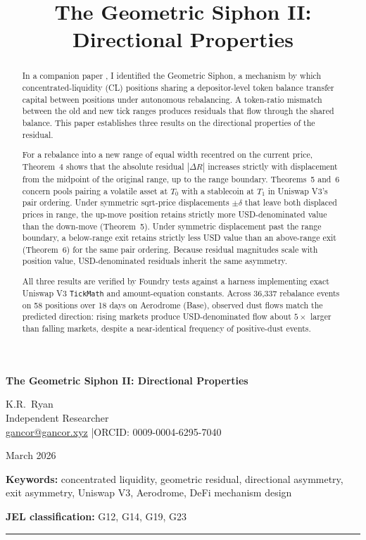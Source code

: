 \documentclass[11pt,a4paper]{article}
\title{The Geometric Siphon II: Directional Properties}
\theoremstyle{definition}
\begin{document}
\thispagestyle{plain}

\begin{center}
{\LARGE\bfseries The Geometric Siphon II: Directional Properties}

\vspace{12pt}
{\large K.R.\ Ryan}\\[4pt]
{\small Independent Researcher}\\[2pt]
{\small \href{mailto:gancor@gancor.xyz}{gancor@gancor.xyz} \quad|\quad ORCID: 0009-0004-6295-7040}

\vspace{8pt}
March 2026

\vspace{6pt}
{\small\textbf{Keywords:} concentrated liquidity, geometric residual, directional asymmetry,\\
exit asymmetry, Uniswap V3, Aerodrome, DeFi mechanism design}

\vspace{4pt}
{\small\textbf{JEL classification:} G12, G14, G19, G23}
\end{center}

\vspace{8pt}
\hrule
\vspace{12pt}

\begin{abstract}
In a companion paper \citep{ryan2026a}, I identified the Geometric Siphon, a mechanism by which concentrated-liquidity (CL) positions sharing a depositor-level token balance transfer capital between positions under autonomous rebalancing. A token-ratio mismatch between the old and new tick ranges produces residuals that flow through the shared balance. This paper establishes three results on the directional properties of the residual.

For a rebalance into a new range of equal width recentred on the current price, Theorem~4 shows that the absolute residual $|\Delta R|$ increases strictly with displacement from the midpoint of the original range, up to the range boundary. Theorems~5 and~6 concern pools pairing a volatile asset at $T_0$ with a stablecoin at $T_1$ in Uniswap V3's pair ordering. Under symmetric sqrt-price displacements $\pm\delta$ that leave both displaced prices in range, the up-move position retains strictly more USD-denominated value than the down-move (Theorem~5). Under symmetric displacement past the range boundary, a below-range exit retains strictly less USD value than an above-range exit (Theorem~6) for the same pair ordering. Because residual magnitudes scale with position value, USD-denominated residuals inherit the same asymmetry.

All three results are verified by Foundry tests against a harness implementing exact Uniswap V3 \texttt{TickMath} and amount-equation constants. Across 36{,}337 rebalance events on 58 positions over 18 days on Aerodrome (Base), observed dust flows match the predicted direction: rising markets produce USD-denominated flow about $5\times$ larger than falling markets, despite a near-identical frequency of positive-dust events.
\end{abstract}
\end{document}
